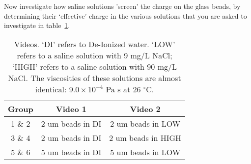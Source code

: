 Now investigate how saline solutions 'screen' the charge on the glass beads, by determining their `effective' charge in the various solutions that you are asked to investigate in table~\ref{tab:lab7-vids}.
\begin{table}[ht]
	\centering
	\begin{tabular}{|c|c|c|}
	\hline 
	\textbf{Group} & \textbf{Video 1} & \textbf{Video 2} \\ 
	\hline 
	1 \& 2 & 2 um beads in DI & 2 um beads in LOW \\ 
	\hline 
	3 \& 4 & 2 um beads in DI & 2 um beads in HIGH \\ 
	\hline 
	5 \& 6 & 5 um beads in DI & 5 um beads in LOW \\ 
	\hline 
	\end{tabular}
	\caption{Videos. `DI' refers to De-Ionized water. `LOW' refers to a saline solution with 9 mg/L NaCl; `HIGH' refers to a saline solution with 90 mg/L NaCl. The viscosities of these solutions are almost identical: $9.0 \times 10^{-4}$ Pa s at 26 $^{\circ}$C.}
	\label{tab:lab7-vids}
\end{table} 